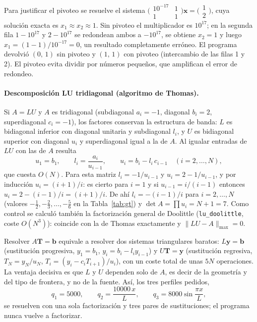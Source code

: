 \documentclass[11pt,a4paper]{article}
\newcommand{\vect}[1]{\bm{#1}}
\begin{document}
Para justificar el pivoteo se resuelve el sistema $\bigl(\begin{smallmatrix}10^{-17}&1\\1&1\end{smallmatrix}\bigr)\vect x=\bigl(\begin{smallmatrix}1\\2\end{smallmatrix}\bigr)$, cuya solución exacta es $x_1\approx x_2\approx1$. Sin pivoteo el multiplicador es $10^{17}$; en la segunda fila $1-10^{17}$ y $2-10^{17}$ se redondean ambos a $-10^{17}$, se obtiene $x_2=1$ y luego $x_1=(1-1)/10^{-17}=0$, un resultado completamente erróneo. El programa devolvió $(0,\,1)$ sin pivoteo y $(1,\,1)$ con pivoteo (intercambio de las filas 1 y 2). El pivoteo evita dividir por números pequeños, que amplifican el error de redondeo.

\paragraph{Descomposición LU tridiagonal (algoritmo de Thomas).}
Si $A=LU$ y $A$ es tridiagonal (subdiagonal $a_i=-1$, diagonal $b_i=2$, superdiagonal $c_i=-1$), los factores conservan la estructura de banda: $L$ es bidiagonal inferior con diagonal unitaria y subdiagonal $l_i$, y $U$ es bidiagonal superior con diagonal $u_i$ y superdiagonal igual a la de $A$. Al igualar entradas de $LU$ con las de $A$ resulta
\begin{equation}
u_1=b_1,\qquad l_i=\frac{a_i}{u_{i-1}},\qquad u_i=b_i-l_i\,c_{i-1}\quad(i=2,\dots,N), \label{eq:thomasLU}
\end{equation}
que cuesta $O(N)$. Para esta matriz $l_i=-1/u_{i-1}$ y $u_i=2-1/u_{i-1}$, y por inducción $u_i=(i+1)/i$: es cierto para $i=1$ y si $u_{i-1}=i/(i-1)$ entonces $u_i=2-(i-1)/i=(i+1)/i$. De ahí $l_i=-(i-1)/i$ para $i=2,\dots,N$ (valores $-\tfrac12,-\tfrac23,\dots,-\tfrac56$ en la Tabla~\ref{tab:gt}) y $\det A=\prod u_i=N+1=7$. Como control se calculó también la factorización general de Doolittle (\texttt{lu\_doolittle}, coste $O(N^3)$): coincide con la de Thomas exactamente y $\|LU-A\|_{\max}=0$.

Resolver $A\vect T=\vect b$ equivale a resolver dos sistemas triangulares baratos: $L\vect y=\vect b$ (sustitución progresiva, $y_1=b_1$, $y_i=b_i-l_iy_{i-1}$) y $U\vect T=\vect y$ (sustitución regresiva, $T_N=y_N/u_N$, $T_i=(y_i-c_iT_{i+1})/u_i$), con un coste total de unas $5N$ operaciones. La ventaja decisiva es que $L$ y $U$ dependen solo de $A$, es decir de la geometría y del tipo de frontera, y no de la fuente. Así, los tres perfiles pedidos,
\[
q_1=5000,\qquad q_2=\frac{10000\,x}{L},\qquad q_3=8000\sin\frac{\pi x}{L},
\]
se resuelven con una sola factorización y tres pares de sustituciones; el programa nunca vuelve a factorizar.
\end{document}
